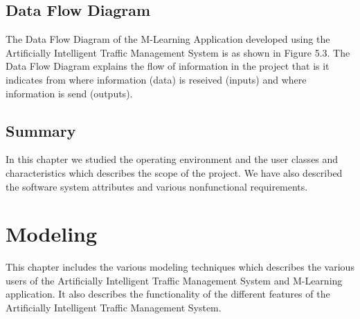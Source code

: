 \documentclass[openany,12pt]{report}
\begin{document}
\section{Data Flow Diagram}
\hspace*{0.5in} The Data Flow Diagram of the M-Learning Application developed using the Artificially Intelligent Traffic Management System is as shown in Figure 5.3. The Data Flow Diagram explains the flow of information in the project that is it indicates from where information (data) is reseived (inputs) and where information is send (outputs).\\

\section{Summary}
\hspace*{0.5in} In this chapter we studied the operating environment and the user classes and characteristics which describes the scope of the project. We have also described the software system attributes and various nonfunctional requirements.

\chapter{Modeling}

\hspace*{0.5in} This chapter includes the various modeling techniques which describes the various users of the Artificially Intelligent Traffic Management System and M-Learning application. It also describes the functionality of the different features of the Artificially Intelligent Traffic Management System.
\end{document}
